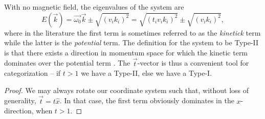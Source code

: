 
With no magnetic field, the eigenvalues of the system are
\begin{equation}
  \label{eq:50}
  E(\vec{k}) = \vec{\omega_{0}} \vec{k} \pm \sqrt{(v_{i} k_{i})^{2}} = \sqrt{(t_{i} v_{i} k_{i})^{2}} \pm \sqrt{(v_{i} k_{i})^{2}},
\end{equation}
where in the literature the first term is sometimes referred to as the \emph{kinetick} term while the latter is the \emph{potential} term.
The definition for the system to be Type-II is that there exists a direction in momentum space for which the kinetic term dominates over the potential term \cite{soluyanovTypeIIWeylSemimetals2015}.
The \(\vec{t}\)-vector is thus a convenient tool for categorization -- if \(t > 1\) we have a Type-II, else we have a Type-I.
\begin{proof}
  We may always rotate our coordinate system such that, without loss of generality, \(\vec{t} = t \hat{x}\).
  In that case, the first term obviously dominates in the \(x\)-direction, when $t>1$.
\end{proof}



